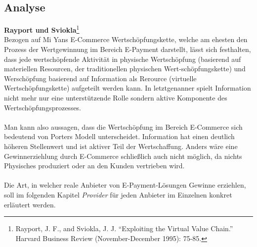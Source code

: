 \subsection{Analyse}
\textbf{Rayport und Sviokla}\footnote{Rayport, J. F., and Sviokla, J. J. “Exploiting the Virtual Value Chain.” Harvard Business Review (November-December 1995): 75-85.}\\
Bezogen auf Mi Yans E-Commerce Wertschöpfungskette, welche am ehesten den Prozess der Wertgewinnung im Bereich E-Payment darstellt, lässt sich festhalten, dass jede wertschöpfende Aktivität in physische Wertschöpfung (basierend auf materiellen Resourcen, der traditionellen physischen Wert-schöpfungskette) und Werschöpfung basierend auf Information als Rerource (virtuelle Wertschöpfungskette) aufgeteilt werden kann. In letztgenanner spielt Information nicht mehr nur eine unterstützende Rolle sondern aktive Komponente des Wertschöpfungsprozesses.\\
\\
Man kann also aussagen, dass die Wertschöpfung im Bereich E-Commerce sich bedeutend von Porters Modell unterscheidet. Information hat einen deutlich höheren Stellenwert und ist aktiver Teil der Wertschaffung. Anders wäre eine Gewinnerziehlung durch E-Commerce schließlich auch nicht möglich, da nichts Physisches produziert oder an den Kunden vertrieben wird.\\
\\
Die Art, in welcher reale Anbieter von E-Payment-Lösungen Gewinne erziehlen, soll im folgenden Kapitel \emph{Provider} für jeden Anbieter im Einzelnen konkret erläutert werden.